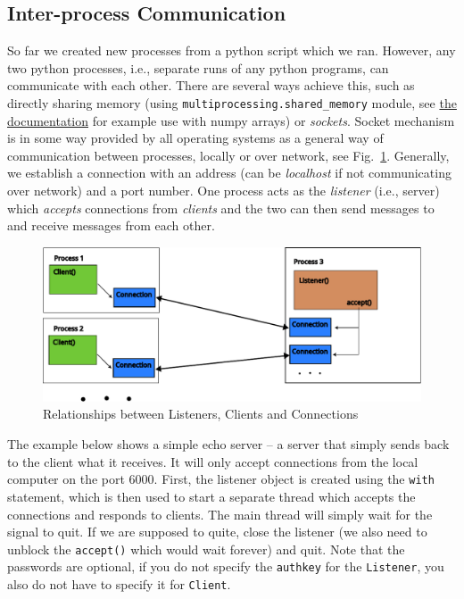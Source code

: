 \documentclass{article}
\newcommand{\ls}[1]{\lstinline{#1}}
\begin{document}
\subsection{Inter-process Communication}
So far we created new processes from a python script which we ran. However, any two python processes, i.e., separate runs of any python programs, can communicate with each other. There are several ways achieve this, such as directly sharing memory (using \ls{multiprocessing.shared_memory} module, see \href{https://docs.python.org/3/library/multiprocessing.shared_memory.html}{the documentation} for example use with numpy arrays) or \emph{sockets}. Socket mechanism is in some way provided by all operating systems as a general way of communication between processes, locally or over network, see Fig.~\ref{fig:listener-client}. Generally, we establish a connection with an address (can be \emph{localhost} if not communicating over network) and a port number. One process acts as the \emph{listener} (i.e., server) which \emph{accepts} connections from \emph{clients} and the two can then send messages to and receive messages from each other.

\begin{figure}
    \label{fig:listener-client}
    \includegraphics[width=\textwidth]{listener_client.pdf}
    \caption{Relationships between Listeners, Clients and Connections}
\end{figure}

The example below shows a simple echo server -- a server that simply sends back to the client what it receives. It will only accept connections from the local computer on the port 6000. First, the listener object is created using the \ls{with} statement, which is then used to start a separate thread which accepts the connections and responds to clients. The main thread will simply wait for the signal to quit. If we are supposed to quite, close the listener (we also need to unblock the \ls{accept()} which would wait forever) and quit. Note that the passwords are optional, if you do not specify the \ls{authkey} for the \ls{Listener}, you also do not have to specify it for \ls{Client}.
\end{document}
